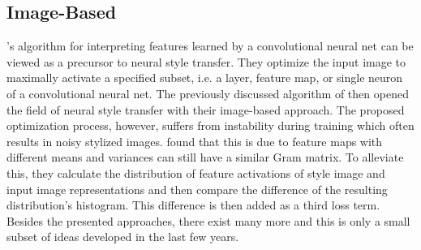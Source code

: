 \documentclass{seminar}
\begin{document}
	\subsection{Image-Based}
	\cite{simonyan2013deep}'s algorithm for interpreting features learned by a convolutional neural net can be viewed as a precursor to neural style transfer. They optimize the input image to maximally activate a specified subset, i.e. a layer, feature map, or single neuron of a convolutional neural net.
	The previously discussed algorithm of \cite{gatys2015neural} then opened the field of neural style transfer with their image-based approach. The proposed optimization process, however, suffers from instability during training which often results in noisy stylized images. 
	\cite{risser2017stable} found that this is due to feature maps with different means and variances can still have a similar Gram matrix. To alleviate this, they calculate the distribution of feature activations of style image and input image representations and then compare the difference of the resulting distribution's histogram. This difference is then added as a third loss term.
	Besides the presented approaches, there exist many more and this is only a small subset of ideas developed in the last few years.
	
\end{document}
